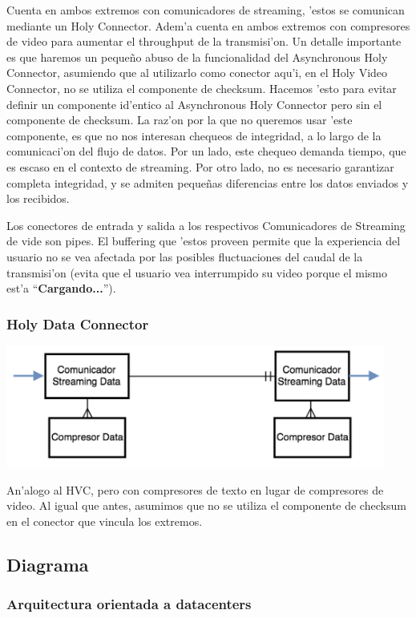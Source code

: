 Cuenta en ambos extremos con comunicadores de streaming, 'estos se comunican mediante un Holy Connector. Adem'a cuenta en ambos extremos con compresores de video para aumentar el throughput de la transmisi'on.
Un detalle importante es que haremos un peque\~no abuso de la funcionalidad del Asynchronous Holy Connector, asumiendo que al utilizarlo como conector aqu'i, en el Holy Video Connector, no se utiliza el componente de checksum. Hacemos 'esto para evitar definir un componente id'entico al Asynchronous Holy Connector pero sin el componente de checksum. La raz'on por la que no queremos usar 'este componente, es que no nos interesan chequeos de integridad, a lo largo de la comunicaci'on del flujo de datos. Por un lado, este chequeo demanda tiempo, que es escaso en el contexto de streaming. Por otro lado, no es necesario garantizar completa integridad, y se admiten peque\~nas diferencias entre los datos enviados y los recibidos.

Los conectores de entrada y salida a los respectivos Comunicadores de Streaming de vide son pipes. El buffering que 'estos proveen permite que la experiencia del usuario no se vea afectada por las posibles fluctuaciones del caudal de la transmisi'on (evita que el usuario vea interrumpido su video porque el mismo est'a ``\textbf{Cargando...}'').

\subsubsection{Holy Data Connector}

\includegraphics[height=4cm]{diagramas/HDC} 

An'alogo al HVC, pero con compresores de texto en lugar de compresores de video. Al igual que antes, asumimos que no se utiliza el componente de checksum en el conector que vincula los extremos.

\subsection{Diagrama}

\subsubsection{Arquitectura orientada a datacenters}

